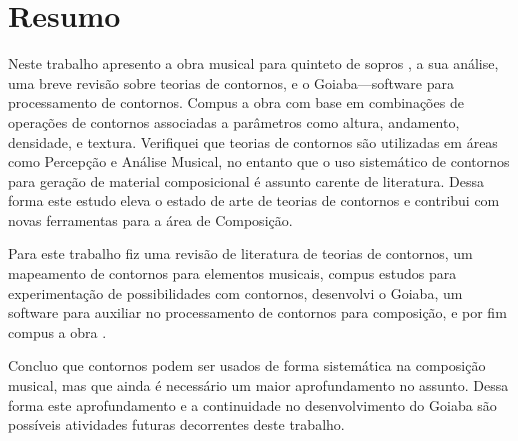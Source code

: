 \chapter*{Resumo}
\label{cha:resumo}

Neste trabalho apresento a obra musical para quinteto de sopros
\obra{}, a sua análise, uma breve revisão sobre teorias de contornos,
e o Goiaba---software para processamento de contornos. Compus a obra
com base em combinações de operações de contornos associadas a
parâmetros como altura, andamento, densidade, e textura. Verifiquei
que teorias de contornos são utilizadas em áreas como Percepção e
Análise Musical, no entanto que o uso sistemático de contornos para
geração de material composicional é assunto carente de
literatura. Dessa forma este estudo eleva o estado de arte de teorias
de contornos e contribui com novas ferramentas para a área de
Composição.

Para este trabalho fiz uma revisão de literatura de teorias de
contornos, um mapeamento de contornos para elementos musicais, compus
estudos para experimentação de possibilidades com contornos,
desenvolvi o Goiaba, um software para auxiliar no processamento de
contornos para composição, e por fim compus a obra \obra{}.

Concluo que contornos podem ser usados de forma sistemática na
composição musical, mas que ainda é necessário um maior aprofundamento
no assunto. Dessa forma este aprofundamento e a continuidade no
desenvolvimento do Goiaba são possíveis atividades futuras decorrentes
deste trabalho.

